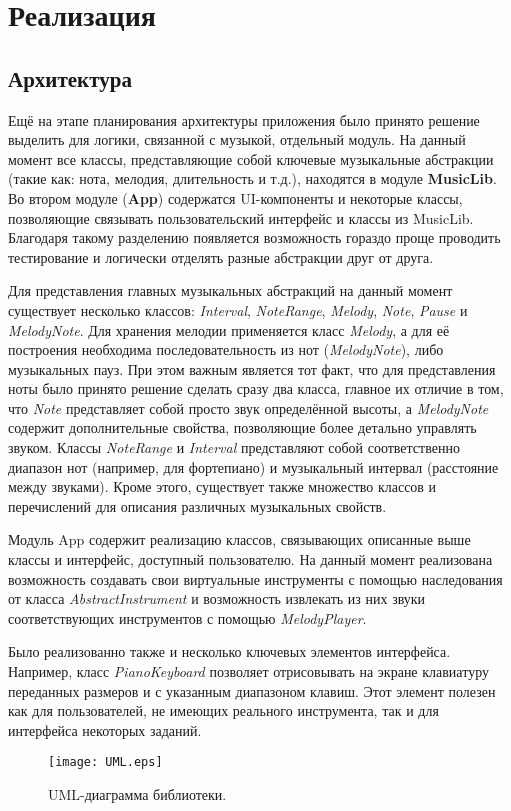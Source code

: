 \chapter{Реализация}
\section{Архитектура}
Ещё на этапе планирования архитектуры приложения было принято решение выделить для логики, связанной с музыкой, отдельный модуль. На данный момент все классы, представляющие собой ключевые музыкальные абстракции (такие как: нота, мелодия, длительность и т.д.), находятся в модуле \textbf{MusicLib}. Во втором модуле (\textbf{App}) содержатся UI-компоненты и некоторые классы, позволяющие связывать пользовательский интерфейс и классы из MusicLib. Благодаря такому разделению появляется возможность гораздо проще проводить тестирование и логически отделять разные абстракции друг от друга.\par
Для представления главных музыкальных абстракций на данный момент существует несколько классов: \textit{Interval}, \textit{NoteRange}, \textit{Melody}, \textit{Note}, \textit{Pause} и \textit{MelodyNote}. Для хранения мелодии применяется класс \textit{Melody}, а для её построения необходима последовательность из нот (\textit{MelodyNote}), либо музыкальных пауз. При этом важным является тот факт, что для представления ноты было принято решение сделать сразу два класса, главное их отличие в том, что \textit{Note} представляет собой просто звук определённой высоты, а \textit{MelodyNote} содержит дополнительные свойства, позволяющие более детально управлять звуком. Классы \textit{NoteRange} и \textit{Interval} представляют собой соответственно диапазон нот (например, для фортепиано) и музыкальный интервал (расстояние между звуками). Кроме этого, существует также множество классов и перечислений для описания различных музыкальных свойств.\par
Модуль App содержит реализацию классов, связывающих описанные выше классы и интерфейс, доступный пользователю. На данный момент реализована возможность создавать свои виртуальные инструменты с помощью наследования от класса \textit{AbstractInstrument} и возможность извлекать из них звуки соответствующих инструментов с помощью \textit{MelodyPlayer}.\par
Было реализованно также и несколько ключевых элементов интерфейса. Например, класс \textit{PianoKeyboard} позволяет отрисовывать на экране клавиатуру переданных размеров и с указанным диапазоном клавиш. Этот элемент полезен как для пользователей, не имеющих реального инструмента, так и для интерфейса некоторых заданий.

\begin{figure}[h!]
  \centering
  \texttt{[image: UML.eps]}
  \caption{UML-диаграмма библиотеки.}
  \label{fig:boat1}
\end{figure}
